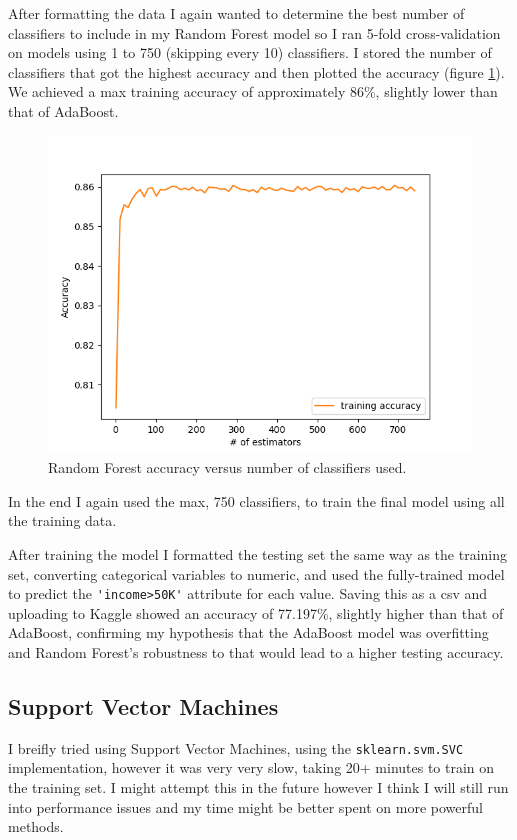 \documentclass[conference]{IEEEtran}
\begin{document}
        After formatting the data I again wanted to determine the best number of classifiers to include in my Random Forest model so I ran 5-fold cross-validation on models using 1 to 750 (skipping every 10) classifiers. I stored the number of classifiers that got the highest accuracy and then plotted the accuracy (figure \ref{fig:rf_acc}). We achieved a max training accuracy of approximately 86\%, slightly lower than that of AdaBoost. 
        \begin{figure}[h]
            \centering
            \includegraphics[width=0.75\linewidth]{./img/rf_acc.png}
            \caption{Random Forest accuracy versus number of classifiers used.}
            \label{fig:rf_acc}
        \end{figure}

        In the end I again used the max, 750 classifiers, to train the final model using all the training data.

        After training the model I formatted the testing set the same way as the training set, converting categorical variables to numeric, and used the fully-trained model to predict the \lstinline{'income>50K'} attribute for each value. Saving this as a csv and uploading to Kaggle showed an accuracy of 77.197\%, slightly higher than that of AdaBoost, confirming my hypothesis that the AdaBoost model was overfitting and Random Forest's robustness to that would lead to a higher testing accuracy.
    
    \subsection{Support Vector Machines}
        I breifly tried using Support Vector Machines, using the \lstinline{sklearn.svm.SVC} implementation, however it was very very slow, taking 20+ minutes to train on the training set. I might attempt this in the future however I think I will still run into performance issues and my time might be better spent on more powerful methods.
\end{document}
